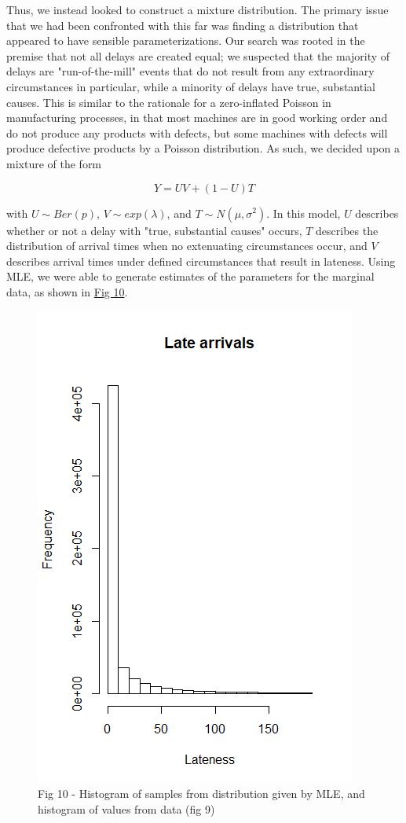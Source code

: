 \documentclass[12pt, a4paper]{book}
\newcommand\tab[1][1cm]{\hspace*{#1}}
\begin{document}
	\tab Thus, we instead looked to construct a mixture distribution. The primary issue that we had been confronted with this far was finding a distribution that appeared to have sensible parameterizations.  Our search was rooted in the premise that not all delays are created equal;  we suspected that the majority of delays are "run-of-the-mill" events that do not result from any extraordinary circumstances in particular, while a minority of delays have true, substantial causes. This is similar to the rationale for a zero-inflated Poisson in manufacturing processes, in that most machines are in good working order and do not produce any products with defects, but some machines with defects will produce defective products by a Poisson distribution. As such, we decided upon a mixture of the form \begin{center}$$Y = UV + (1-U)T$$\end{center} with $U\sim Ber(p)$, $V\sim exp(\lambda)$, and $T\sim  N(\mu,\sigma^2)$. In this model, $U$ describes whether or not a delay with "true, substantial causes" occurs, $T$ describes the distribution of arrival times when no extenuating circumstances occur, and $V$ describes arrival times under defined circumstances that result in lateness. Using MLE, we were able to generate estimates of the parameters for the marginal data, as shown in \underline{Fig 10}.\\
			\begin{figure}
			\centering
	 		\includegraphics[width = .45 \textwidth]{../figures/LateArrivalsHistogram}
	 		\caption{Fig 10 - Histogram of samples from distribution given by MLE, and histogram of values from data (fig 9)}
	 		\end{figure}
\end{document}
